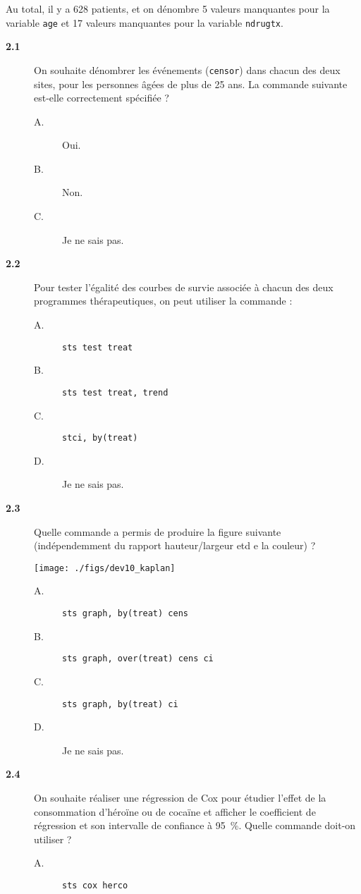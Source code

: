 Au total, il y a 628 patients, et on dénombre 5 valeurs manquantes pour la
variable \texttt{age} et 17 valeurs manquantes pour la variable
\texttt{ndrugtx}. 
\begin{description}
\item[\bf 2.1] On souhaite dénombrer les événements (\texttt{censor}) dans
  chacun des deux sites, pour les personnes âgées de plus de 25 ans. La
  commande suivante est-elle correctement spécifiée ? 
\begin{description}
\item[A.] Oui.
\item[B.] Non.
\item[C.] Je ne sais pas.
\end{description}
\item[\bf 2.2] Pour tester l'égalité des courbes de survie associée à chacun
  des deux programmes thérapeutiques, on peut utiliser la commande :
\begin{description}
\item[A.] \verb|sts test treat|
\item[B.] \verb|sts test treat, trend|
\item[C.] \verb|stci, by(treat)|
\item[D.] Je ne sais pas.
\end{description}
\item[\bf 2.3] Quelle commande a permis de produire la figure suivante
  (indépendemment du rapport hauteur/largeur etd e la couleur) ?
  \begin{center}
    \texttt{[image: ./figs/dev10\_kaplan]}
  \end{center}
\begin{description}
\item[A.] \verb|sts graph, by(treat) cens|
\item[B.] \verb|sts graph, over(treat) cens ci|
\item[C.] \verb|sts graph, by(treat) ci|
\item[D.] Je ne sais pas.
\end{description}
\item[\bf 2.4] On souhaite réaliser une régression de Cox pour étudier
  l'effet de la consommation d'héroïne ou de cocaïne et afficher le
  coefficient de régression et son intervalle de confiance à 95~\%. Quelle
  commande doit-on utiliser ? 
\begin{description}
\item[A.] \verb|sts cox herco|

\end{description}
\end{description}
